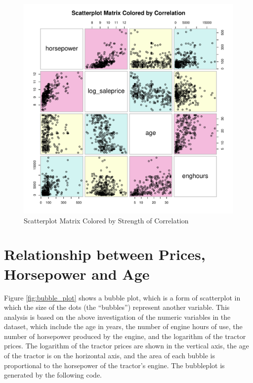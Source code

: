 \begin{figure}[h!]
  \centering
  \includegraphics[scale = 0.5, keepaspectratio=true]{../Figures/scatter_matrix}
  \caption{Scatterplot Matrix Colored by Strength of Correlation} \label{fig:scatter_matrix}
\end{figure}



\pagebreak
\section{Relationship between Prices, Horsepower and Age}


Figure \ref{fig:bubble_plot}
shows a bubble plot,
which is a form of scatterplot in which the size of the dots (the ``bubbles'')
represent another variable.
This analysis is based on the above investigation
of the numeric variables in the dataset,
which include
the age in years, the number of engine hours of use,
the number of horsepower produced by the engine,
and the logarithm of the tractor prices.
The logarithm of the tractor prices are shown in the vertical axis,
the age of the tractor is on the horizontal axis,
and the area of each bubble is proportional
to the horsepower of the tractor's engine.
The bubbleplot is
generated by the following code.

\vfill


